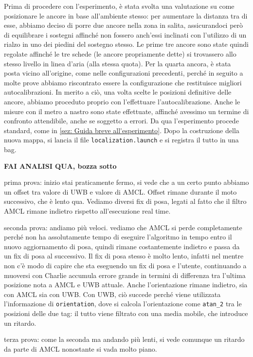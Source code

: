 Prima di procedere con l'esperimento, è stata svolta una valutazione su come posizionare le ancore in base all'ambiente stesso: per aumentare la distanza tra di 
esse, abbiamo deciso di porre due ancore nella zona in salita, assicurandoci però di equilibrare i sostegni affinché non fossero anch'essi inclinati con l'utilizzo 
di un rialzo in uno dei piedini del sostegno stesso. Le prime tre ancore sono state quindi regolate affinché le tre schede (le ancore propriamente dette) si 
trovassero allo stesso livello in linea d'aria (alla stessa quota). Per la quarta ancora, è stata posta vicino all'origine, come nelle configurazioni precedenti, 
perché in seguito a molte prove abbiamo riscontrato essere la configurazione che restituisce migliori autocalibrazioni. In merito a ciò, una volta scelte le 
posizioni definitive delle ancore, abbiamo proceduto proprio con l'effettuare l'autocalibrazione. Anche le misure con il metro a nastro sono state effettuate, 
affinché avessimo un termine di confronto attendibile, anche se soggetto a errori. Da qua l'esperimento procede standard, come in \ref{sez: Guida breve all'esperimento}. 
Dopo la costruzione della nuova mappa, si lancia il file \verb|localization.launch| e si registra il tutto in una bag.

\textbf{FAI ANALISI QUA, bozza sotto}


prima prova: inizio stai praticamente fermo, si vede che a un certo punto abbiamo un offset tra valore di UWB e valore di AMCL. Offset rimane durante il moto successivo, che 
è lento qua. Vediamo diversi fix di posa, legati al fatto che il filtro AMCL rimane indietro rispetto all'esecuzione real time. 

seconda prova: andiamo più veloci. vediamo che AMCL si perde completamente perché non ha assolutamente tempo di eseguire l'algoritmo in tempo entro il nuovo aggiornamento di 
posa, quindi rimane costantemente indietro e passa da un fix di posa al successivo. Il fix di posa stesso è molto lento, infatti nel mentre non c'è modo di capire
che sta eseguendo un fix di posa e l'utente, continuando a muoversi con Charlie accumula errore grande in termini di differenza tra l'ultima posizione nota a AMCL e UWB attuale.
Anche l'orientazione rimane indietro, sia con AMCL sia con UWB. Con UWB, ciò succede perché viene utilizzata l'informazione di \verb|orientation|, dove si calcola l'orientazione come \verb|atan_2| tra le posizioni delle due tag: il tutto viene filtrato con una media mobile, che introduce un ritardo.

terza prova: come la seconda ma andando più lenti, si vede comunque un ritardo da parte di AMCL nonostante si vada molto piano.


